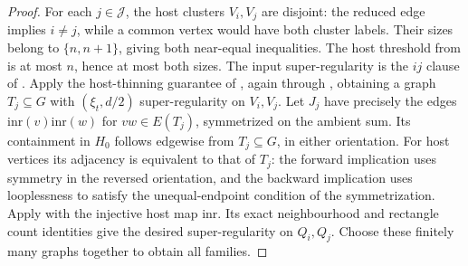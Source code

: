 \begin{proof}
For each $j\in\mathcal J$, the host clusters $V_i,V_j$ are disjoint:
the reduced edge implies $i\ne j$, while a common vertex would have
both cluster labels. Their sizes belong to $\{n,n+1\}$, giving both
near-equal inequalities. The host threshold from
 is at most $n$, hence at most
both sizes. The input super-regularity is the $ij$ clause of
. Apply the host-thinning guarantee of
, again through
, obtaining a graph $T_j\subseteq G$
with $(\xi_t,d/2)$ super-regularity on $V_i,V_j$.
Let $J_j$ have precisely the edges
$\mathrm{inr}(v)\mathrm{inr}(w)$ for $vw\in E(T_j)$, symmetrized
on the ambient sum. Its containment in $H_0$ follows edgewise from
$T_j\subseteq G$, in either orientation. For host vertices its
adjacency is equivalent to that of $T_j$: the forward implication
uses symmetry in the reversed orientation, and the backward implication
uses looplessness to satisfy the unequal-endpoint condition of the
symmetrization. Apply  with the
injective host map $\mathrm{inr}$. Its exact neighbourhood and rectangle
count identities give the desired super-regularity on $Q_i,Q_j$.
Choose these finitely many graphs together to obtain all families.
\end{proof}
